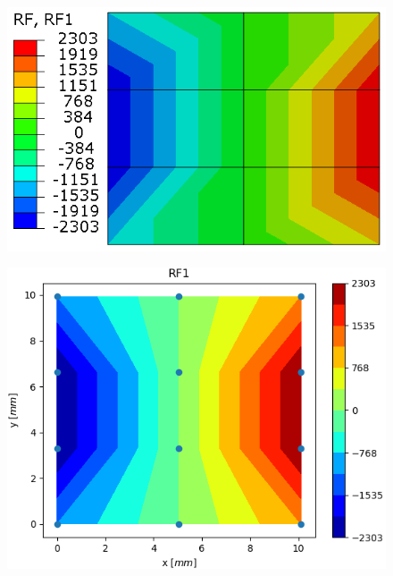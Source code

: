 \documentclass[11pt]{article}
\begin{document}
\begin{figure}[H]
	\centering
	\begin{minipage}{.5\textwidth}
		\centering
		\includegraphics[width=1\linewidth]{EM23RF1.png}
		\label{EM23RF1}
	\end{minipage}%
	\begin{minipage}{.5\textwidth}
		\centering
		\includegraphics[width=1\linewidth]{EM23RF1_IGA.png}
		\label{EM23RF1_IGA}
	\end{minipage}
\end{figure}
\end{document}
